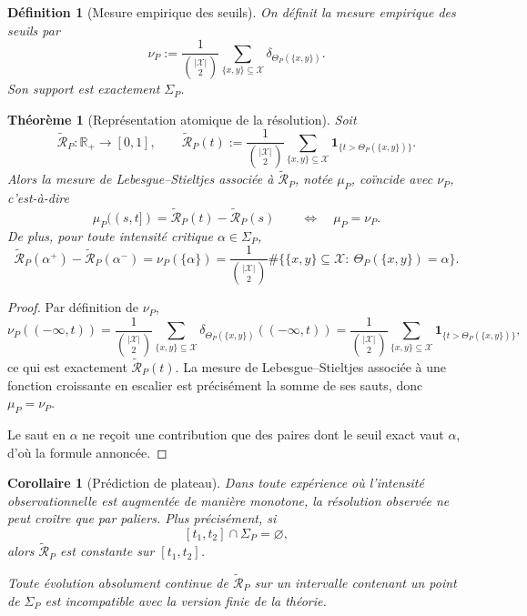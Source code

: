 \documentclass[11pt,a4paper]{article}
\newtheorem{definition}{Définition}
\newtheorem{theorem}{Théorème}
\newtheorem{corollary}{Corollaire}
\begin{document}
\begin{definition}[Mesure empirique des seuils]
On définit la mesure empirique des seuils par
\[
\nu_P
:=
\frac{1}{\binom{|\mathcal X|}{2}}
\sum_{\{x,y\}\subseteq\mathcal X}\delta_{\Theta_P(\{x,y\})}.
\]
Son support est exactement \(\Sigma_P\).
\end{definition}

\begin{theorem}[Représentation atomique de la résolution]
Soit
\[
\widetilde{\mathcal R}_P:\mathbb R_+\longrightarrow [0,1],
\qquad
\widetilde{\mathcal R}_P(t)
:=
\frac{1}{\binom{|\mathcal X|}{2}}
\sum_{\{x,y\}\subseteq\mathcal X}
\mathbf 1_{\{t>\Theta_P(\{x,y\})\}}.
\]
Alors la mesure de Lebesgue--Stieltjes associée à \(\widetilde{\mathcal R}_P\), notée \(\mu_P\), coïncide avec \(\nu_P\), c'est-à-dire
\[
\mu_P((s,t])=\widetilde{\mathcal R}_P(t)-\widetilde{\mathcal R}_P(s)
\qquad\Longleftrightarrow\quad
\mu_P=\nu_P.
\]
De plus, pour toute intensité critique \(\alpha\in\Sigma_P\),
\[
\widetilde{\mathcal R}_P(\alpha^+)-\widetilde{\mathcal R}_P(\alpha^-)
=
\nu_P(\{\alpha\})
=
\frac{1}{\binom{|\mathcal X|}{2}}
\#\bigl\{\{x,y\}\subseteq\mathcal X:\ \Theta_P(\{x,y\})=\alpha\bigr\}.
\]
\end{theorem}

\begin{proof}
Par définition de \(\nu_P\),
\[
\nu_P((-\infty,t))
=
\frac{1}{\binom{|\mathcal X|}{2}}
\sum_{\{x,y\}\subseteq\mathcal X}
\delta_{\Theta_P(\{x,y\})}((-\infty,t))
=
\frac{1}{\binom{|\mathcal X|}{2}}
\sum_{\{x,y\}\subseteq\mathcal X}
\mathbf 1_{\{t>\Theta_P(\{x,y\})\}},
\]
ce qui est exactement \(\widetilde{\mathcal R}_P(t)\). La mesure de Lebesgue--Stieltjes associée à une fonction croissante en escalier est précisément la somme de ses sauts, donc \(\mu_P=\nu_P\).

Le saut en \(\alpha\) ne reçoit une contribution que des paires dont le seuil exact vaut \(\alpha\), d'où la formule annoncée.
\end{proof}

\begin{corollary}[Prédiction de plateau]
Dans toute expérience où l'intensité observationnelle est augmentée de manière monotone, la résolution observée ne peut croître que par paliers. Plus précisément, si
\[
[t_1,t_2]\cap\Sigma_P=\varnothing,
\]
alors \(\widetilde{\mathcal R}_P\) est constante sur \([t_1,t_2]\).

Toute évolution absolument continue de \(\widetilde{\mathcal R}_P\) sur un intervalle contenant un point de \(\Sigma_P\) est incompatible avec la version finie de la théorie.
\end{corollary}
\end{document}
